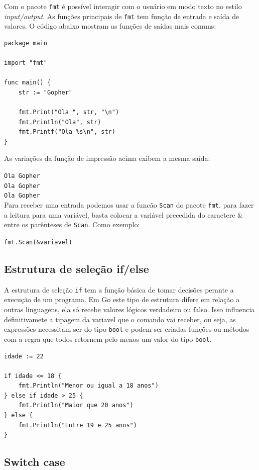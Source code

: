 \documentclass{SBCbookchapter}
\begin{document}
Com o pacote \texttt{fmt} é possível interagir com o usuário em modo texto no estilo \textit{input/output}. As funções principais de \texttt{fmt} tem função de entrada e saída de valores. O código abaixo mostram as funções de saídas mais comuns:

\begin{lstlisting}
package main

import "fmt"

func main() {
	str := "Gopher"
	
	fmt.Print("Ola ", str, "\n")
	fmt.Println("Ola", str)
	fmt.Printf("Ola %s\n", str)
}
\end{lstlisting}

As variações da função de impressão acima exibem a mesma saída:

\noindent\texttt{Ola Gopher}\\
\texttt{Ola Gopher}\\
\texttt{Ola Gopher}\\

Para receber uma entrada podemos usar a funcão \texttt{Scan} do pacote \texttt{fmt}. para fazer a leitura para uma variável, basta colocar a variável precedida do caractere \& entre os parênteses de \texttt{Scan}. Como exemplo:

\noindent\texttt{fmt.Scan(\&variavel)}\\

\subsection{Estrutura de seleção if/else}

A estrutura de seleção \texttt{if} tem a função básica de tomar decisões perante a execução de um programa. Em Go este tipo de estrutura difere em relação a outras linguagens, ela só recebe valores lógicos verdadeiro ou falso. Isso influencia definitivamete a tipagem da variavel que o comando vai receber, ou seja, as expressões necessitam ser do tipo \texttt{bool} e podem ser criadas funções ou métodos com a regra que todos retornem pelo menos um valor do tipo \texttt{bool}.

\begin{lstlisting}
idade := 22

if idade <= 18 {
	fmt.Println("Menor ou igual a 18 anos")
} else if idade > 25 {
	fmt.Println("Maior que 20 anos")
} else {
	fmt.Println("Entre 19 e 25 anos")
}
\end{lstlisting}

\subsection{Switch case}
\end{document}
